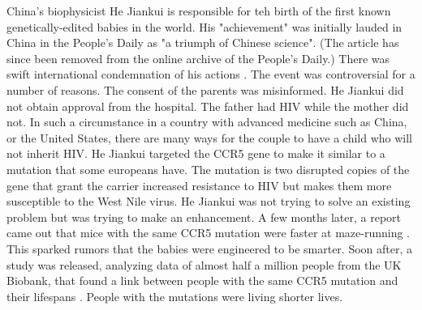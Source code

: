 China's biophysicist He Jiankui is responsible for teh birth of the first known genetically-edited babies in the world.
His "achievement" was initially lauded in China in the People's Daily as "a triumph of Chinese science".
(The article has since been removed from the online archive of the People's Daily.)
There was swift international condemnation of his actions \cite{crisprbabies2018}.
The event was controversial for a number of reasons.
The consent of the parents was misinformed.
He Jiankui did not obtain approval from the hospital.
The father had HIV while the mother did not.
In such a circumstance in a country with advanced medicine such as China, or the United States, there are many ways for the couple to have a child who will not inherit HIV.
He Jiankui targeted the CCR5 gene to make it similar to a mutation that some europeans have.
The mutation is two disrupted copies of the gene that grant the carrier increased resistance to HIV but makes them more susceptible to the West Nile virus.
He Jiankui was not trying to solve an existing problem but was trying to make an enhancement.
A few months later, a report came out that mice with the same CCR5 mutation were faster at maze-running \cite{Regalado2019}.
This sparked rumors that the babies were engineered to be smarter.
Soon after, a study was released, analyzing data of almost half a million people from the UK Biobank, that found a link between people with the same CCR5 mutation and their lifespans \cite{Wei2019}.
People with the mutations were living shorter lives.

